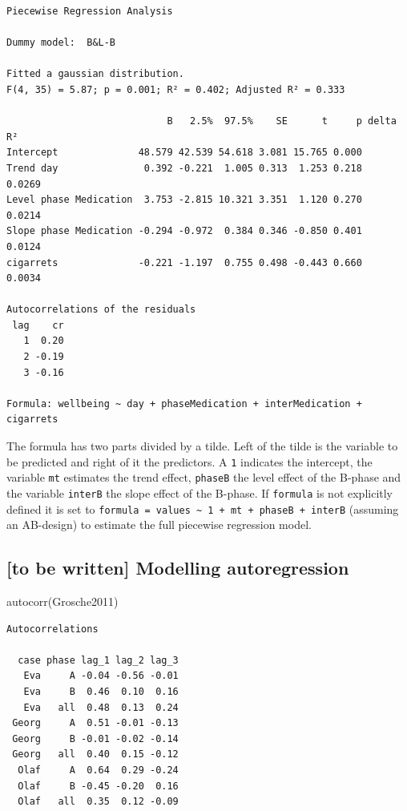 \documentclass[
]{book}
\newenvironment{Shaded}{\begin{snugshade}}{\end{snugshade}}
\newcommand{\FunctionTok}[1]{\textcolor[rgb]{0.00,0.00,0.00}{#1}}
\newcommand{\NormalTok}[1]{#1}
\begin{document}
\begin{verbatim}
Piecewise Regression Analysis

Dummy model:  B&L-B 

Fitted a gaussian distribution.
F(4, 35) = 5.87; p = 0.001; R² = 0.402; Adjusted R² = 0.333

                            B   2.5%  97.5%    SE      t     p delta R²
Intercept              48.579 42.539 54.618 3.081 15.765 0.000         
Trend day               0.392 -0.221  1.005 0.313  1.253 0.218   0.0269
Level phase Medication  3.753 -2.815 10.321 3.351  1.120 0.270   0.0214
Slope phase Medication -0.294 -0.972  0.384 0.346 -0.850 0.401   0.0124
cigarrets              -0.221 -1.197  0.755 0.498 -0.443 0.660   0.0034

Autocorrelations of the residuals
 lag    cr
   1  0.20
   2 -0.19
   3 -0.16

Formula: wellbeing ~ day + phaseMedication + interMedication + cigarrets
\end{verbatim}

The formula has two parts divided by a tilde. Left of the tilde is the variable to be predicted and right of it the predictors. A \texttt{1} indicates the intercept, the variable \texttt{mt} estimates the trend effect, \texttt{phaseB} the level effect of the B-phase and the variable \texttt{interB} the slope effect of the B-phase. If \texttt{formula} is not explicitly defined it is set to \texttt{formula\ =\ values\ \textasciitilde{}\ 1\ +\ mt\ +\ phaseB\ +\ interB} (assuming an AB-design) to estimate the full piecewise regression model.

\hypertarget{to-be-written-modelling-autoregression}{%
\subsection{{[}to be written{]} Modelling autoregression}\label{to-be-written-modelling-autoregression}}

\begin{Shaded}
\begin{Highlighting}[]
\FunctionTok{autocorr}\NormalTok{(Grosche2011)}
\end{Highlighting}
\end{Shaded}

\begin{verbatim}
Autocorrelations

  case phase lag_1 lag_2 lag_3
   Eva     A -0.04 -0.56 -0.01
   Eva     B  0.46  0.10  0.16
   Eva   all  0.48  0.13  0.24
 Georg     A  0.51 -0.01 -0.13
 Georg     B -0.01 -0.02 -0.14
 Georg   all  0.40  0.15 -0.12
  Olaf     A  0.64  0.29 -0.24
  Olaf     B -0.45 -0.20  0.16
  Olaf   all  0.35  0.12 -0.09
\end{verbatim}
\end{document}
